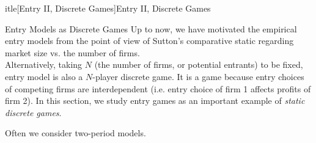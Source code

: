 
\def\beamerclassoptions{[notes=show]}


\newenvironment{stepenumerate}{\begin{enumerate}[<+->]}{\end{enumerate}}
\newenvironment{stepitemize}{\begin{itemize}[<+->]}{\end{itemize} }
\newenvironment{stepenumeratewithalert}{\begin{enumerate}[<+-| alert@+>]}{\end{enumerate}}
\newenvironment{stepitemizewithalert}{\begin{itemize}[<+-| alert@+>]}{\end{itemize} }
%

	itle[Entry II, Discrete Games]{Entry II, Discrete Games}
\subtitle{}
\author[]{Julie Holland Mortimer}
\date[]{Economics 853}
\maketitle

\begin{frame}{Entry Models as Discrete Games}
Up to now, we have motivated the empirical entry models from the point of view of Sutton's comparative static regarding market size vs. the number of firms. \\
\vspace{2mm}
Alternatively, taking $N$ (the number of firms, or potential entrants) to be fixed, entry model is also a $N$-player discrete game. It is a game because entry choices of competing firms are interdependent (i.e. entry choice of firm 1 affects profits of firm 2). In this section, we study entry games as an important example of \emph{static discrete games}. \\

\vspace{2mm}

Often we consider two-period models.

\end{frame}


